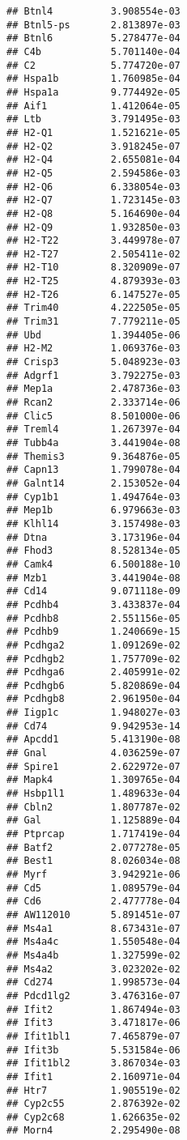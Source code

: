 \documentclass[
]{article}
\begin{document}
\begin{verbatim}
## Btnl4          3.908554e-03
## Btnl5-ps       2.813897e-03
## Btnl6          5.278477e-04
## C4b            5.701140e-04
## C2             5.774720e-07
## Hspa1b         1.760985e-04
## Hspa1a         9.774492e-05
## Aif1           1.412064e-05
## Ltb            3.791495e-03
## H2-Q1          1.521621e-05
## H2-Q2          3.918245e-07
## H2-Q4          2.655081e-04
## H2-Q5          2.594586e-03
## H2-Q6          6.338054e-03
## H2-Q7          1.723145e-03
## H2-Q8          5.164690e-04
## H2-Q9          1.932850e-03
## H2-T22         3.449978e-07
## H2-T27         2.505411e-02
## H2-T10         8.320909e-07
## H2-T25         4.879393e-03
## H2-T26         6.147527e-05
## Trim40         4.222505e-05
## Trim31         7.779211e-05
## Ubd            1.394405e-06
## H2-M2          1.069376e-03
## Crisp3         5.048923e-03
## Adgrf1         3.792275e-03
## Mep1a          2.478736e-03
## Rcan2          2.333714e-06
## Clic5          8.501000e-06
## Treml4         1.267397e-04
## Tubb4a         3.441904e-08
## Themis3        9.364876e-05
## Capn13         1.799078e-04
## Galnt14        2.153052e-04
## Cyp1b1         1.494764e-03
## Mep1b          6.979663e-03
## Klhl14         3.157498e-03
## Dtna           3.173196e-04
## Fhod3          8.528134e-05
## Camk4          6.500188e-10
## Mzb1           3.441904e-08
## Cd14           9.071118e-09
## Pcdhb4         3.433837e-04
## Pcdhb8         2.551156e-05
## Pcdhb9         1.240669e-15
## Pcdhga2        1.091269e-02
## Pcdhgb2        1.757709e-02
## Pcdhga6        2.405991e-02
## Pcdhgb6        5.820869e-04
## Pcdhgb8        2.961950e-04
## Iigp1c         1.948027e-03
## Cd74           9.942953e-14
## Apcdd1         5.413190e-08
## Gnal           4.036259e-07
## Spire1         2.622972e-07
## Mapk4          1.309765e-04
## Hsbp1l1        1.489633e-04
## Cbln2          1.807787e-02
## Gal            1.125889e-04
## Ptprcap        1.717419e-04
## Batf2          2.077278e-05
## Best1          8.026034e-08
## Myrf           3.942921e-06
## Cd5            1.089579e-04
## Cd6            2.477778e-04
## AW112010       5.891451e-07
## Ms4a1          8.673431e-07
## Ms4a4c         1.550548e-04
## Ms4a4b         1.327599e-02
## Ms4a2          3.023202e-02
## Cd274          1.998573e-04
## Pdcd1lg2       3.476316e-07
## Ifit2          1.867494e-03
## Ifit3          3.471817e-06
## Ifit1bl1       7.465879e-07
## Ifit3b         5.531584e-06
## Ifit1bl2       3.867034e-03
## Ifit1          2.160971e-04
## Htr7           1.905519e-02
## Cyp2c55        2.876392e-02
## Cyp2c68        1.626635e-02
## Morn4          2.295490e-08

\end{verbatim}
\end{document}
